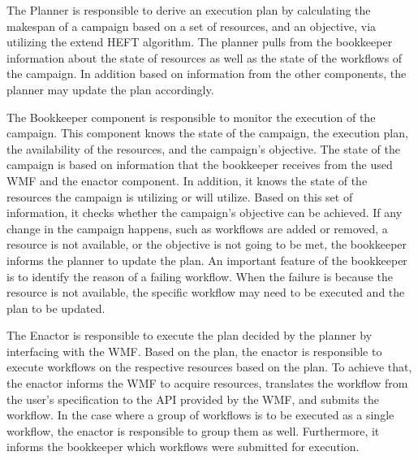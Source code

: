 The Planner is responsible to derive an execution plan by calculating the makespan of a campaign based on a set of resources, and an objective, via utilizing the extend HEFT algorithm. 
The planner pulls from the bookkeeper information about the state of resources as well as the state of the workflows of the campaign.
In addition based on information from the other components, the planner may update the plan accordingly. 

The Bookkeeper component is responsible to monitor the execution of the campaign.
This component knows the state of the campaign, the execution plan, the availability of the resources, and the campaign's objective.
The state of the campaign is based on information that the bookkeeper receives from the used WMF and the enactor component.
In addition, it knows the state of the resources the campaign is utilizing or will utilize.
Based on this set of information, it checks whether the campaign's objective can be achieved.
If any change in the campaign happens, such as workflows are added or removed, a resource is not available, or the objective is not going to be met, the bookkeeper informs the planner to update the plan.
An important feature of the bookkeeper is to identify the reason of a failing workflow.
When the failure is because the resource is not available, the specific workflow may need to be executed and the plan to be updated.

The Enactor is responsible to execute the plan decided by the planner by interfacing with the WMF.
Based on the plan, the enactor is responsible to execute workflows on the respective resources based on the plan.
To achieve that, the enactor informs the WMF to acquire resources, translates the workflow from the user's specification to the API provided by the WMF, and submits the workflow.
In the case where a group of workflows is to be executed as a single workflow, the enactor is responsible to group them as well.
Furthermore, it informs the bookkeeper which workflows were submitted for execution.



